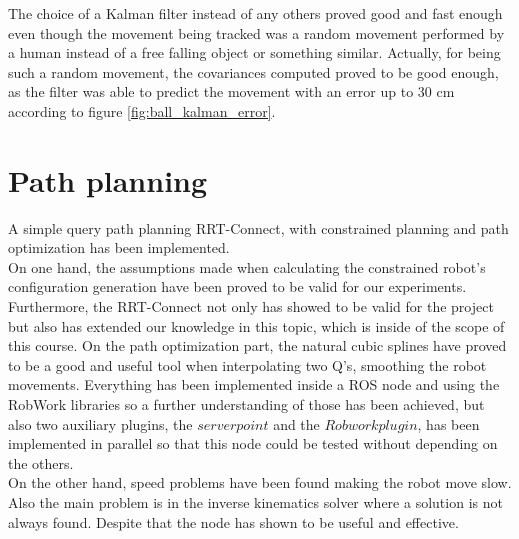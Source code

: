 The choice of a Kalman filter instead of any others proved good and fast enough even though the movement being tracked was a random movement performed by a human instead of a free falling object or something similar. Actually, for being such a random movement, the covariances computed proved to be good enough, as the filter was able to predict the movement with an error up to 30 cm according to figure \ref{fig:ball_kalman_error}.

\section{Path planning}
A simple query path planning RRT-Connect, with constrained planning and path optimization has been implemented. \\

On one hand, the assumptions made when calculating the constrained robot's configuration generation have been proved to be valid for our experiments. 
Furthermore, the RRT-Connect not only has showed to be valid for the project but also has extended our knowledge in this topic, which is inside of the scope of this course.
On the path optimization part, the natural cubic splines have proved to be a good and useful tool when interpolating two Q's, smoothing the robot movements. Everything has been implemented inside a ROS node and using the RobWork libraries so a further understanding of those has been achieved, but also two auxiliary plugins, the $server point$ and the $Robwork plugin$, has been implemented in parallel so that this node could be tested without depending on the others.\\

On the other hand, speed problems have been found making the robot move slow. Also the main problem is in the inverse kinematics solver where a solution is not always found. Despite that the node has shown to be useful and effective.


